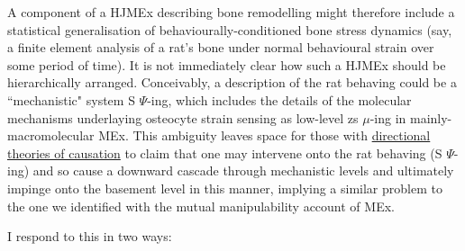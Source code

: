  A component of a HJMEx describing bone remodelling might therefore include a statistical generalisation of behaviourally-conditioned bone stress dynamics (say, a finite element analysis of a rat's bone under normal behavioural strain over some period of time). It is not immediately clear how such a HJMEx should be hierarchically arranged. Conceivably, a description of the rat behaving could be a ``mechanistic" system S $\Psi$-ing, which includes the details of the molecular mechanisms underlaying osteocyte strain sensing as low-level zs $\mu$-ing in mainly-macromolecular MEx. This ambiguity leaves space for those with \hyperref[causality]{directional theories of causation} to claim that one may intervene onto the rat behaving (S $\Psi$-ing) and so cause a downward cascade through mechanistic levels and ultimately impinge onto the basement level in this manner, implying a similar problem to the one we identified with the mutual manipulability account of MEx.
 
 I respond to this in two ways:
 
